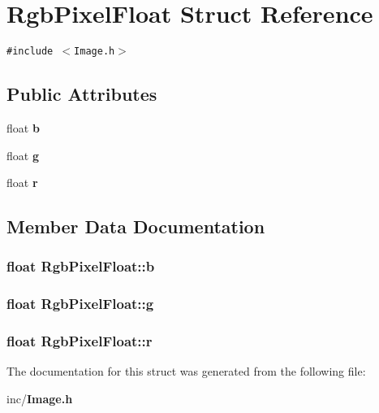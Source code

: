 \section{RgbPixelFloat Struct Reference}
\label{structRgbPixelFloat}
{\tt \#include $<$Image.h$>$}

\subsection*{Public Attributes}
\begin{CompactItemize}
\item 
float {\bf b}
\item 
float {\bf g}
\item 
float {\bf r}
\end{CompactItemize}


\subsection{Member Data Documentation}
\subsubsection{\setlength{\rightskip}{0pt plus 5cm}float {\bf RgbPixelFloat::b}}\label{structRgbPixelFloat_97cdd6c61c87fed8ffcc4492c3f5de2d}


\subsubsection{\setlength{\rightskip}{0pt plus 5cm}float {\bf RgbPixelFloat::g}}\label{structRgbPixelFloat_6f04fa6799f1e67072b3d53aed318d0f}


\subsubsection{\setlength{\rightskip}{0pt plus 5cm}float {\bf RgbPixelFloat::r}}\label{structRgbPixelFloat_b4fc0f3ef850578208e95a334fa8f3c2}




The documentation for this struct was generated from the following file:\begin{CompactItemize}
\item 
inc/{\bf Image.h}\end{CompactItemize}
